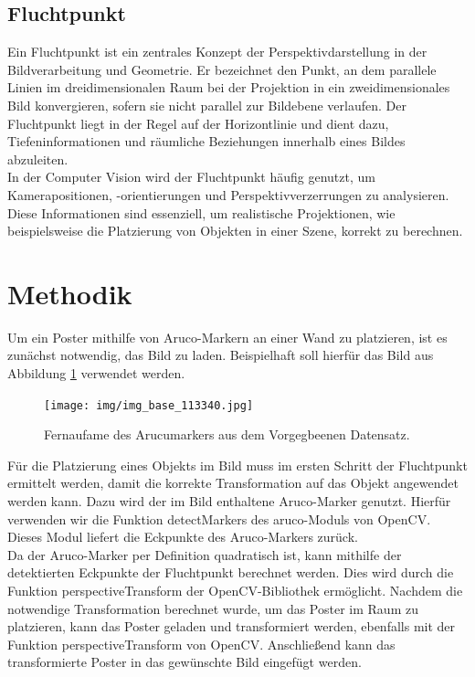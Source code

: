 \documentclass[a4paper,twocolumn]{article}
\begin{document}
\subsection{Fluchtpunkt}

Ein Fluchtpunkt ist ein zentrales Konzept der Perspektivdarstellung in der Bildverarbeitung und Geometrie. Er bezeichnet den Punkt, an dem parallele Linien im dreidimensionalen Raum bei der Projektion in ein zweidimensionales Bild konvergieren, sofern sie nicht parallel zur Bildebene verlaufen. Der Fluchtpunkt liegt in der Regel auf der Horizontlinie und dient dazu, Tiefeninformationen und räumliche Beziehungen innerhalb eines Bildes abzuleiten.
\\
In der Computer Vision wird der Fluchtpunkt häufig genutzt, um Kamerapositionen, -orientierungen und Perspektivverzerrungen zu analysieren. Diese Informationen sind essenziell, um realistische Projektionen, wie beispielsweise die Platzierung von Objekten in einer Szene, korrekt zu berechnen.
\section{Methodik}
Um ein Poster mithilfe von Aruco-Markern an einer Wand zu platzieren, ist es zunächst notwendig, das Bild zu laden. Beispielhaft soll hierfür das Bild aus Abbildung \ref{fig:example-base} verwendet werden.
\begin{figure}[h!]
    \centering
    \texttt{[image: img/img\_base\_113340.jpg]} %
    \caption{Fernaufame des Arucumarkers aus dem Vorgegbeenen Datensatz.}
    \label{fig:example-base}
\end{figure}
Für die Platzierung eines Objekts im Bild muss im ersten Schritt der Fluchtpunkt ermittelt werden, damit die korrekte Transformation auf das Objekt angewendet werden kann. Dazu wird der im Bild enthaltene Aruco-Marker genutzt. Hierfür verwenden wir die Funktion detectMarkers des aruco-Moduls von OpenCV. Dieses Modul liefert die Eckpunkte des Aruco-Markers zurück.
\\
Da der Aruco-Marker per Definition quadratisch ist, kann mithilfe der detektierten Eckpunkte der Fluchtpunkt berechnet werden. Dies wird durch die Funktion perspectiveTransform der OpenCV-Bibliothek ermöglicht. Nachdem die notwendige Transformation berechnet wurde, um das Poster im Raum zu platzieren, kann das Poster geladen und transformiert werden, ebenfalls mit der Funktion perspectiveTransform von OpenCV. Anschließend kann das transformierte Poster in das gewünschte Bild eingefügt werden.
\end{document}
